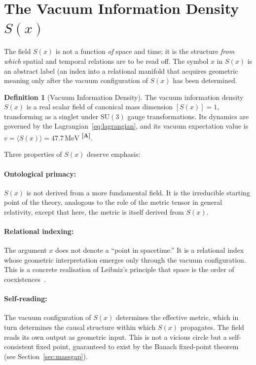 \documentclass[12pt,a4paper,twoside]{article}
\theoremstyle{plain}
\theoremstyle{definition}
\newtheorem{definition}[theorem]{Definition}
\theoremstyle{remark}
\newcommand{\MeV}{\,\mathrm{MeV}}
\newcommand{\catmark}[1]{\textsuperscript{\textsf{\textbf{[#1]}}}}
\newcommand{\Sx}{S(x)}
\newcommand{\vVEV}{47.7\MeV}                        %
\begin{document}
\section{The Vacuum Information Density \texorpdfstring{$S(x)$}{S(x)}}
\label{sec:sx}

The field $\Sx$ is not a function \emph{of} space and time; it is the
structure \emph{from which} spatial and temporal relations are to be read off.
The symbol $x$ in $\Sx$ is an abstract label (an index into a relational
manifold that acquires geometric meaning only after the vacuum configuration of
$\Sx$ has been determined.

\begin{definition}[Vacuum Information Density]
The vacuum information density $\Sx$ is a real scalar field of canonical mass
dimension $[\Sx] = 1$, transforming as a singlet under $\mathrm{SU}(3)$ gauge
transformations. Its dynamics are governed by the Lagrangian~\eqref{eq:lagrangian},
and its vacuum expectation value is $v = \langle \Sx \rangle = \vVEV$
\catmark{A}.
\end{definition}

Three properties of $\Sx$ deserve emphasis:

\paragraph{Ontological primacy:}\vspace{-1.5em}
$\Sx$ is not derived from a more fundamental field. It is the irreducible
starting point of the theory, analogous to the role of the metric tensor in
general relativity, except that here, the metric is itself derived from $\Sx$.

\paragraph{Relational indexing:}\vspace{-0.8em}
The argument $x$ does not denote a ``point in spacetime.'' It is a relational
index whose geometric interpretation emerges only through the vacuum
configuration. This is a concrete realisation of Leibniz's principle that space
is the order of coexistences~\cite{Leibniz1714}.

\paragraph{Self-reading:}\vspace{-0.8em}
The vacuum configuration of $\Sx$ determines the effective metric, which in
turn determines the causal structure within which $\Sx$ propagates. The field
reads its own output as geometric input. This is not a vicious circle but a
self-consistent fixed point, guaranteed to exist by the Banach fixed-point
theorem~\cite{Banach1922} (see Section~\ref{sec:massgap}).
\end{document}
